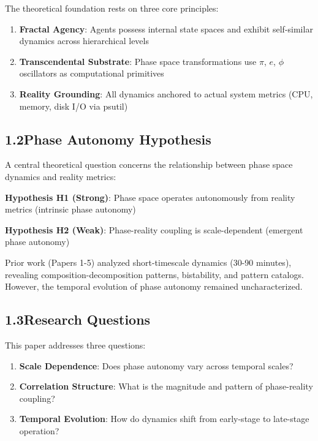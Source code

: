 \documentclass[11pt]{article}
\begin{document}
The theoretical foundation rests on three core principles:

\begin{enumerate}
    \item \textbf{Fractal Agency}: Agents possess internal state spaces and exhibit self-similar dynamics across hierarchical levels
    \item \textbf{Transcendental Substrate}: Phase space transformations use $\pi$, $e$, $\phi$ oscillators as computational primitives
    \item \textbf{Reality Grounding}: All dynamics anchored to actual system metrics (CPU, memory, disk I/O via psutil)
\end{enumerate}

\subsection*{1.2\quad Phase Autonomy Hypothesis}

A central theoretical question concerns the relationship between phase space dynamics and reality metrics:

\noindent\textbf{Hypothesis H1 (Strong)}: Phase space operates autonomously from reality metrics (intrinsic phase autonomy)

\noindent\textbf{Hypothesis H2 (Weak)}: Phase-reality coupling is scale-dependent (emergent phase autonomy)

Prior work (Papers 1-5) analyzed short-timescale dynamics (30-90 minutes), revealing composition-decomposition patterns, bistability, and pattern catalogs. However, the temporal evolution of phase autonomy remained uncharacterized.

\subsection*{1.3\quad Research Questions}

This paper addresses three questions:

\begin{enumerate}
    \item \textbf{Scale Dependence}: Does phase autonomy vary across temporal scales?
    \item \textbf{Correlation Structure}: What is the magnitude and pattern of phase-reality coupling?
    \item \textbf{Temporal Evolution}: How do dynamics shift from early-stage to late-stage operation?
\end{enumerate}
\end{document}
